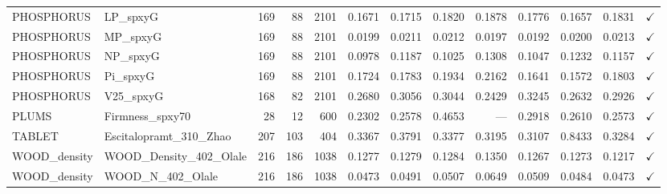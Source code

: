 \begin{tabular}{llrrrrrrrrrrc}
PHOSPHORUS & LP\_spxyG & 169 & 88 & 2101 & 0.1671 & 0.1715 & 0.1820 & 0.1878 & 0.1776 & 0.1657 & 0.1831 & $\checkmark$ \\
PHOSPHORUS & MP\_spxyG & 169 & 88 & 2101 & 0.0199 & 0.0211 & 0.0212 & 0.0197 & 0.0192 & 0.0200 & 0.0213 & $\checkmark$ \\
PHOSPHORUS & NP\_spxyG & 169 & 88 & 2101 & 0.0978 & 0.1187 & 0.1025 & 0.1308 & 0.1047 & 0.1232 & 0.1157 & $\checkmark$ \\
PHOSPHORUS & Pi\_spxyG & 169 & 88 & 2101 & 0.1724 & 0.1783 & 0.1934 & 0.2162 & 0.1641 & 0.1572 & 0.1803 & $\checkmark$ \\
PHOSPHORUS & V25\_spxyG & 168 & 82 & 2101 & 0.2680 & 0.3056 & 0.3044 & 0.2429 & 0.3245 & 0.2632 & 0.2926 & $\checkmark$ \\
PLUMS & Firmness\_spxy70 & 28 & 12 & 600 & 0.2302 & 0.2578 & 0.4653 & --- & 0.2918 & 0.2610 & 0.2573 & $\checkmark$ \\
TABLET & Escitalopramt\_310\_Zhao & 207 & 103 & 404 & 0.3367 & 0.3791 & 0.3377 & 0.3195 & 0.3107 & 0.8433 & 0.3284 & $\checkmark$ \\
WOOD\_density & WOOD\_Density\_402\_Olale & 216 & 186 & 1038 & 0.1277 & 0.1279 & 0.1284 & 0.1350 & 0.1267 & 0.1273 & 0.1217 & $\checkmark$ \\
WOOD\_density & WOOD\_N\_402\_Olale & 216 & 186 & 1038 & 0.0473 & 0.0491 & 0.0507 & 0.0649 & 0.0509 & 0.0484 & 0.0473 & $\checkmark$ \\
\bottomrule
\end{tabular}


